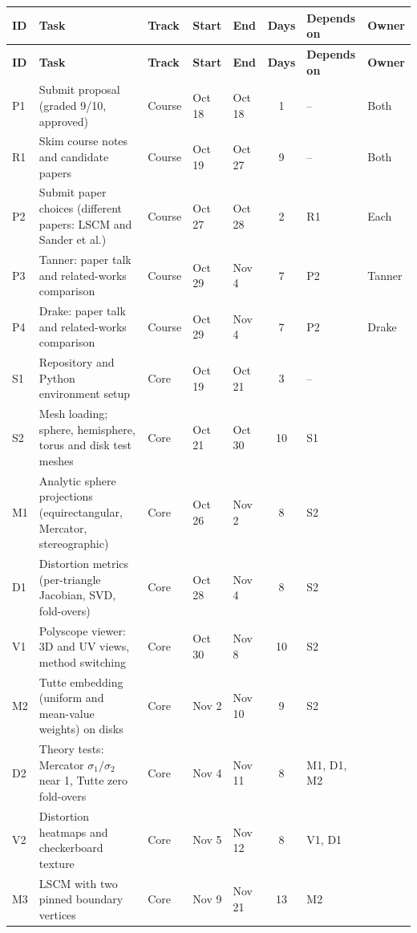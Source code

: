 \documentclass[11pt]{article}
\newcommand{\trcourse}{\rowcolor{course}}
\newcommand{\trcore}{\rowcolor{core}}
\begin{document}
\medskip
\renewcommand{\arraystretch}{1.15}
\begin{longtable}{@{}l >{\raggedright\arraybackslash}p{7.5cm} l l l c >{\raggedright\arraybackslash}p{3cm} p{2.5cm}@{}}
\toprule
\textbf{ID} & \textbf{Task} & \textbf{Track} & \textbf{Start} & \textbf{End} & \textbf{Days} & \textbf{Depends on} & \textbf{Owner} \\
\midrule
\endfirsthead
\toprule
\textbf{ID} & \textbf{Task} & \textbf{Track} & \textbf{Start} & \textbf{End} & \textbf{Days} & \textbf{Depends on} & \textbf{Owner} \\
\midrule
\endhead
\bottomrule
\endfoot
\trcourse P1 & Submit proposal (graded 9/10, approved) & Course & Oct 18 & Oct 18 & 1 & -- & Both \\
\trcourse R1 & Skim course notes and candidate papers & Course & Oct 19 & Oct 27 & 9 & -- & Both \\
\trcourse P2 & Submit paper choices (different papers: LSCM and Sander et al.) & Course & Oct 27 & Oct 28 & 2 & R1 & Each \\
\trcourse P3 & Tanner: paper talk and related-works comparison & Course & Oct 29 & Nov 4 & 7 & P2 & Tanner \\
\trcourse P4 & Drake: paper talk and related-works comparison & Course & Oct 29 & Nov 4 & 7 & P2 & Drake \\
\trcore S1 & Repository and Python environment setup & Core & Oct 19 & Oct 21 & 3 & -- &  \\
\trcore S2 & Mesh loading; sphere, hemisphere, torus and disk test meshes & Core & Oct 21 & Oct 30 & 10 & S1 &  \\
\trcore M1 & Analytic sphere projections (equirectangular, Mercator, stereographic) & Core & Oct 26 & Nov 2 & 8 & S2 &  \\
\trcore D1 & Distortion metrics (per-triangle Jacobian, SVD, fold-overs) & Core & Oct 28 & Nov 4 & 8 & S2 &  \\
\trcore V1 & Polyscope viewer: 3D and UV views, method switching & Core & Oct 30 & Nov 8 & 10 & S2 &  \\
\trcore M2 & Tutte embedding (uniform and mean-value weights) on disks & Core & Nov 2 & Nov 10 & 9 & S2 &  \\
\trcore D2 & Theory tests: Mercator $\sigma_1/\sigma_2$ near 1, Tutte zero fold-overs & Core & Nov 4 & Nov 11 & 8 & M1, D1, M2 &  \\
\trcore V2 & Distortion heatmaps and checkerboard texture & Core & Nov 5 & Nov 12 & 8 & V1, D1 &  \\
\trcore M3 & LSCM with two pinned boundary vertices & Core & Nov 9 & Nov 21 & 13 & M2 &  \\

\end{longtable}
\end{document}
